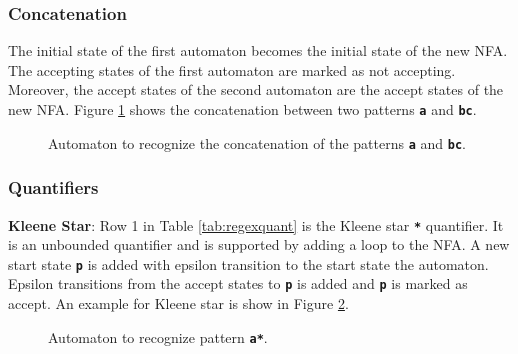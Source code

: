 \subsubsection{Concatenation}
The initial state of the first automaton becomes the initial state of the new NFA. The accepting states of the first automaton are marked as not accepting. Moreover, the accept states of the second automaton are the accept states of the new NFA. Figure \ref{fig:auto3} shows the concatenation between two patterns \texttt{\textbf{a}} and \texttt{\textbf{bc}}.

\begin{figure}[htpb]
\centering
{}
\caption{Automaton to recognize the concatenation of the patterns \texttt{\textbf{a}} and \texttt{\textbf{bc}}.}
\label{fig:auto3}
\end{figure}

\subsubsection{Quantifiers}
\textbf{Kleene Star}: Row 1 in Table \ref{tab:regexquant} is the Kleene star \texttt{\textbf{*}} quantifier. It is an unbounded quantifier and is supported by adding a loop to the NFA. A new start state \texttt{\textbf{p}} is added with epsilon transition to the start state the automaton. Epsilon transitions from the accept states to \texttt{\textbf{p}} is added and \texttt{\textbf{p}} is marked as accept. An example for Kleene star is show in Figure \ref{fig:autoq1}.

\begin{figure}[H]
\centering
{}
\caption{Automaton to recognize pattern \texttt{\textbf{a*}}.}
\label{fig:autoq1}
\end{figure}



